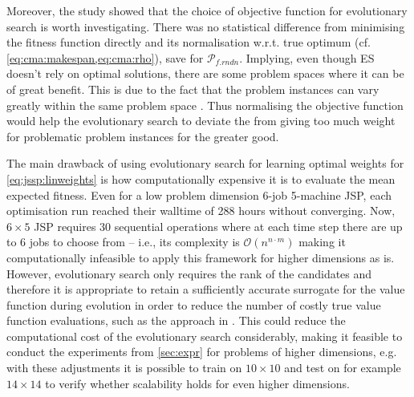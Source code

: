 \documentclass[graybox]{svmult}
\begin{document}
Moreover, the study showed that the choice of objective function  for 
evolutionary search is worth investigating. There was no statistical difference 
from minimising the fitness function directly and its normalisation w.r.t. true 
optimum (cf. \cref{eq:cma:makespan,eq:cma:rho}), save for 
$\mathcal{P}_{f.rndn}$. Implying, even though ES doesn't rely on optimal 
solutions, there are some problem spaces where it can be of great benefit. This 
is due to the fact that the problem instances can vary greatly within the same 
problem space \cite{InRu12}. Thus normalising the objective function would help 
the evolutionary search to deviate the from giving too much weight for 
problematic problem instances for the greater good.


The main drawback of using evolutionary search for learning optimal weights for 
\cref{eq:jssp:linweights} is how computationally expensive it is to evaluate 
the mean expected fitness. Even for a low problem dimension 6-job 5-machine 
JSP, each optimisation run reached their walltime of 288 hours without 
converging. Now, $6\times5$ JSP requires 30 sequential operations where at each 
time step there are up to $6$ jobs to choose from -- i.e., its complexity is 
$\mathcal{O}(n^{n\cdot m})$ making it computationally infeasible to apply this 
framework for higher dimensions as is. 
However, evolutionary search only requires the rank of the candidates and 
therefore it is appropriate to retain a sufficiently accurate surrogate for the 
value function during evolution in order to reduce the number of costly true 
value function evaluations, such as the approach in \cite{InRu11b}. This could 
reduce the computational cost of the evolutionary search considerably, making 
it feasible to conduct the experiments from \cref{sec:expr} for problems of 
higher dimensions, e.g. with these adjustments it is possible to train on 
$10\times10$ and test on for example $14\times14$ to verify whether scalability 
holds for even higher dimensions.  

\clearpage


\end{document}
